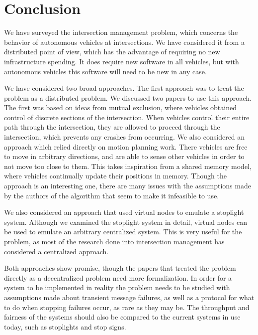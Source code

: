 \documentclass[12pt]{article}
\begin{document}
\section{Conclusion}
We have surveyed the intersection management problem, which concerns the behavior of autonomous vehicles at intersections. We have considered it from a distributed point of view, which has the advantage of requiring no new infrastructure spending. It does require new software in all vehicles, but with autonomous vehicles this software will need to be new in any case.\par
We have considered two broad approaches. The first approach was to treat the problem as a distributed problem. We discussed two papers to use this approach. The first was based on ideas from mutual exclusion, where vehicles obtained control of discrete sections of the intersection. When vehicles control their entire path through the intersection, they are allowed to proceed through the intersection, which prevents any crashes from occurring. We also considered an approach which relied directly on motion planning work. There vehicles are free to move in arbitrary directions, and are able to sense other vehicles in order to not move too close to them. This takes inspiration from a shared memory model, where vehicles continually update their positions in memory. Though the approach is an interesting one, there are many issues with the assumptions made by the authors of the algorithm that seem to make it infeasible to use.\par
We also considered an approach that used virtual nodes to emulate a stoplight system. Although we examined the stoplight system in detail, virtual nodes can be used to emulate an arbitrary centralized system. This is very useful for the problem, as most of the research done into intersection management has considered a centralized approach.\par
Both approaches show promise, though the papers that treated the problem directly as a decentralized problem need more formalization. In order for a system to be implemented in reality the problem needs to be studied with assumptions made about transient message failures, as well as a protocol for what to do when stopping failures occur, as rare as they may be. The throughput and fairness of the systems should also be compared to the current systems in use today, such as stoplights and stop signs.

\label{sec:conclusion}

\pagebreak
\end{document}

